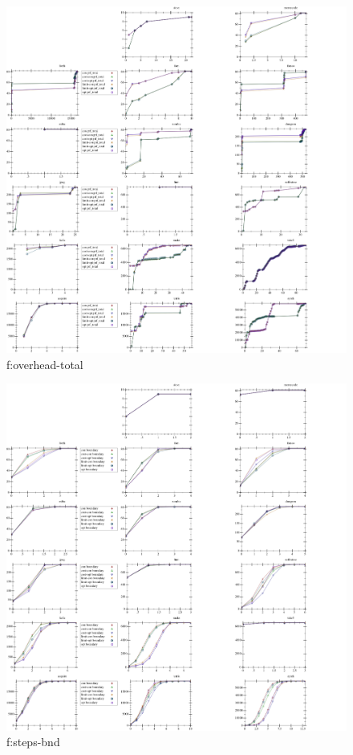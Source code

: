 \documentclass[acmsmall,review,anonymous]{acmart}
\begin{document}
\begin{figure}[t]
  \includegraphics[width=\textwidth]{data/cdf-overhead_prf_total.pdf}
  \caption{f:overhead-total}
  \label{f:overhead-total}
\end{figure}

\begin{figure}[t]
  \includegraphics[width=\textwidth]{data/cdf-steps_boundary.pdf}
  \caption{f:steps-bnd}
  \label{f:steps-bnd}
\end{figure}
\end{document}

